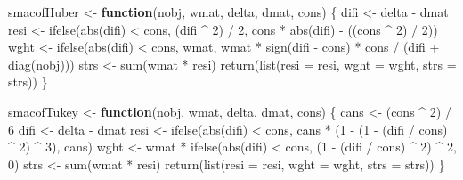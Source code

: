 \documentclass[
  12pt,
  letterpaper,
  DIV=11,
  numbers=noendperiod]{scrartcl}
\newenvironment{Shaded}{\begin{snugshade}}{\end{snugshade}}
\newcommand{\AttributeTok}[1]{\textcolor[rgb]{0.40,0.45,0.13}{#1}}
\newcommand{\ControlFlowTok}[1]{\textcolor[rgb]{0.00,0.23,0.31}{\textbf{#1}}}
\newcommand{\DecValTok}[1]{\textcolor[rgb]{0.68,0.00,0.00}{#1}}
\newcommand{\FunctionTok}[1]{\textcolor[rgb]{0.28,0.35,0.67}{#1}}
\newcommand{\NormalTok}[1]{\textcolor[rgb]{0.00,0.23,0.31}{#1}}
\newcommand{\OtherTok}[1]{\textcolor[rgb]{0.00,0.23,0.31}{#1}}
\newcommand{\SpecialCharTok}[1]{\textcolor[rgb]{0.37,0.37,0.37}{#1}}
\begin{document}
\begin{Shaded}
\begin{Highlighting}[]
\NormalTok{smacofHuber }\OtherTok{\textless{}{-}} \ControlFlowTok{function}\NormalTok{(nobj, wmat, delta, dmat, cons) \{}
\NormalTok{  difi }\OtherTok{\textless{}{-}}\NormalTok{ delta }\SpecialCharTok{{-}}\NormalTok{ dmat}
\NormalTok{  resi }\OtherTok{\textless{}{-}} \FunctionTok{ifelse}\NormalTok{(}\FunctionTok{abs}\NormalTok{(difi) }\SpecialCharTok{\textless{}}\NormalTok{ cons, (difi }\SpecialCharTok{\^{}} \DecValTok{2}\NormalTok{) }\SpecialCharTok{/} \DecValTok{2}\NormalTok{, cons }\SpecialCharTok{*} \FunctionTok{abs}\NormalTok{(difi) }\SpecialCharTok{{-}}\NormalTok{ ((cons }\SpecialCharTok{\^{}} \DecValTok{2}\NormalTok{) }\SpecialCharTok{/} \DecValTok{2}\NormalTok{))}
\NormalTok{  wght }\OtherTok{\textless{}{-}} \FunctionTok{ifelse}\NormalTok{(}\FunctionTok{abs}\NormalTok{(difi) }\SpecialCharTok{\textless{}}\NormalTok{ cons, wmat,}
\NormalTok{                 wmat }\SpecialCharTok{*} \FunctionTok{sign}\NormalTok{(difi }\SpecialCharTok{{-}}\NormalTok{ cons) }\SpecialCharTok{*}\NormalTok{ cons }\SpecialCharTok{/}\NormalTok{ (difi }\SpecialCharTok{+} \FunctionTok{diag}\NormalTok{(nobj)))}
\NormalTok{  strs }\OtherTok{\textless{}{-}} \FunctionTok{sum}\NormalTok{(wmat }\SpecialCharTok{*}\NormalTok{ resi)}
  \FunctionTok{return}\NormalTok{(}\FunctionTok{list}\NormalTok{(}\AttributeTok{resi =}\NormalTok{ resi, }\AttributeTok{wght =}\NormalTok{ wght, }\AttributeTok{strs =}\NormalTok{ strs))}
\NormalTok{\}}

\NormalTok{smacofTukey }\OtherTok{\textless{}{-}} \ControlFlowTok{function}\NormalTok{(nobj, wmat, delta, dmat, cons) \{}
\NormalTok{  cans }\OtherTok{\textless{}{-}}\NormalTok{ (cons }\SpecialCharTok{\^{}} \DecValTok{2}\NormalTok{) }\SpecialCharTok{/} \DecValTok{6}
\NormalTok{  difi }\OtherTok{\textless{}{-}}\NormalTok{ delta }\SpecialCharTok{{-}}\NormalTok{ dmat}
\NormalTok{  resi }\OtherTok{\textless{}{-}} \FunctionTok{ifelse}\NormalTok{(}\FunctionTok{abs}\NormalTok{(difi) }\SpecialCharTok{\textless{}}\NormalTok{ cons,}
\NormalTok{                 cans }\SpecialCharTok{*}\NormalTok{ (}\DecValTok{1} \SpecialCharTok{{-}}\NormalTok{ (}\DecValTok{1} \SpecialCharTok{{-}}\NormalTok{ (difi }\SpecialCharTok{/}\NormalTok{ cons) }\SpecialCharTok{\^{}} \DecValTok{2}\NormalTok{) }\SpecialCharTok{\^{}} \DecValTok{3}\NormalTok{), cans)}
\NormalTok{  wght }\OtherTok{\textless{}{-}}\NormalTok{ wmat }\SpecialCharTok{*} \FunctionTok{ifelse}\NormalTok{(}\FunctionTok{abs}\NormalTok{(difi) }\SpecialCharTok{\textless{}}\NormalTok{ cons,}
\NormalTok{                 (}\DecValTok{1} \SpecialCharTok{{-}}\NormalTok{ (difi }\SpecialCharTok{/}\NormalTok{ cons) }\SpecialCharTok{\^{}} \DecValTok{2}\NormalTok{) }\SpecialCharTok{\^{}} \DecValTok{2}\NormalTok{, }\DecValTok{0}\NormalTok{)}
\NormalTok{  strs }\OtherTok{\textless{}{-}} \FunctionTok{sum}\NormalTok{(wmat }\SpecialCharTok{*}\NormalTok{ resi)}
  \FunctionTok{return}\NormalTok{(}\FunctionTok{list}\NormalTok{(}\AttributeTok{resi =}\NormalTok{ resi, }\AttributeTok{wght =}\NormalTok{ wght, }\AttributeTok{strs =}\NormalTok{ strs))}
\NormalTok{\}}


\end{Highlighting}
\end{Shaded}
\end{document}
